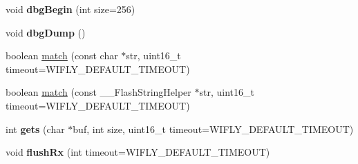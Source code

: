 \begin{DoxyCompactItemize}
\item 
\hypertarget{class_wi_fly_a1ab9fb5e4cd9c0a9d3177c02a96c4a27}{
void {\bfseries dbg\-Begin} (int size=256)}
\label{class_wi_fly_a1ab9fb5e4cd9c0a9d3177c02a96c4a27}

\item 
\hypertarget{class_wi_fly_a08a7b42ffa0575921ca662e8b06a7f6f}{
void {\bfseries dbg\-Dump} ()}
\label{class_wi_fly_a08a7b42ffa0575921ca662e8b06a7f6f}

\item 
boolean \hyperlink{class_wi_fly_ac5e433e67b7412389784bcee0ed37a57}{match} (const char $\ast$str, uint16\-\_\-t timeout=\-W\-I\-F\-L\-Y\-\_\-\-D\-E\-F\-A\-U\-L\-T\-\_\-\-T\-I\-M\-E\-O\-U\-T)
\item 
boolean \hyperlink{class_wi_fly_a3d644dbb4d52d6beb75f325e5986b8de}{match} (const \-\_\-\-\_\-\-Flash\-String\-Helper $\ast$str, uint16\-\_\-t timeout=\-W\-I\-F\-L\-Y\-\_\-\-D\-E\-F\-A\-U\-L\-T\-\_\-\-T\-I\-M\-E\-O\-U\-T)
\item 
\hypertarget{class_wi_fly_a762add6265dd90032287b8865a8a817f}{
int {\bfseries gets} (char $\ast$buf, int size, uint16\-\_\-t timeout=\-W\-I\-F\-L\-Y\-\_\-\-D\-E\-F\-A\-U\-L\-T\-\_\-\-T\-I\-M\-E\-O\-U\-T)}
\label{class_wi_fly_a762add6265dd90032287b8865a8a817f}

\item 
\hypertarget{class_wi_fly_adbdb13ed907cad0d608e950ead08c19e}{
void {\bfseries flush\-Rx} (int timeout=\-W\-I\-F\-L\-Y\-\_\-\-D\-E\-F\-A\-U\-L\-T\-\_\-\-T\-I\-M\-E\-O\-U\-T)}
\label{class_wi_fly_adbdb13ed907cad0d608e950ead08c19e}

\end{DoxyCompactItemize}
